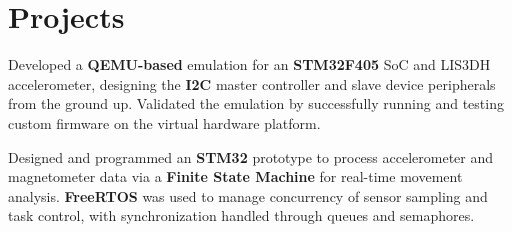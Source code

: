 \section{Projects}
  \resumeHeaderItemListStart
    
    \resumeSubItemListStart
      \resumeSubItem
      {
        Developed a \textbf{QEMU-based} emulation for an \textbf{STM32F405} SoC and LIS3DH accelerometer, 
        designing the \textbf{I2C} master controller and slave device peripherals from the ground up. 
        Validated the emulation by successfully running and testing custom firmware on the virtual hardware platform.
      }
    \resumeSubItemListEnd    


    \resumeSubItemListStart
      \resumeSubItem
      {
        Designed and programmed an \textbf{STM32} prototype to process accelerometer and magnetometer 
        data via a \textbf{Finite State Machine} for real-time movement analysis. 
        \textbf{FreeRTOS} was used to manage concurrency of sensor sampling and task control, with synchronization handled through queues and semaphores.
      }
    \resumeSubItemListEnd

  \resumeHeaderItemListEnd
